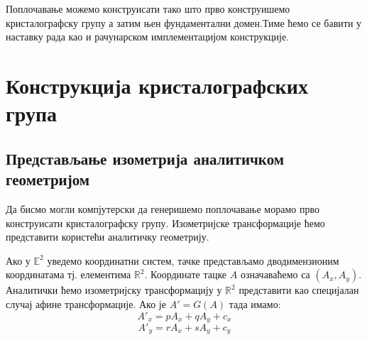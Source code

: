 \documentclass[12pt]{report}
\newtheorem{definition}[theorem]{\bf Дефиниција}
\begin{document}
Поплочавање можемо конструисати тако што прво конструишемо кристалографску групу а затим њен фундаментални домен.Тиме ћемо се бавити у наставку рада као и рачунарском имплементацијом конструкције.






    \chapter{\texorpdfstring{Конструкција кристалографских група
}{Izometrijske transformacije u \textbackslash{}mathbb\{Е\}\^{}2}}\label{izometrijske-transformacije-u-mathbbr2}
\section{Представљање изометрија аналитичком геометријом}

Да бисмо могли компјутерски да генеришемо поплочавање морамо прво конструисати кристалографску групу. Изометријске трансформације ћемо представити користећи аналитичку геометрију.




    Ако у \(\mathbb{E}^2\) уведемо координатни систем, тачке представљамо
дводимензионим координатама тј. елементима \(\mathbb{R}^2\). Координате
тацке \(A\) означаваћемо са \((A_x, A_y)\). Аналитички ћемо изометријску
трансформацију у \(\mathbb{R}^2\) представити као специјалан случај
афине трансформације. Ако је \(A' = G(A)\) тада имамо:
\[A'_x = pA_x + qA_y + c_x\] \[A'_y = rA_x + sA_y + c_y\] 
\end{document}

